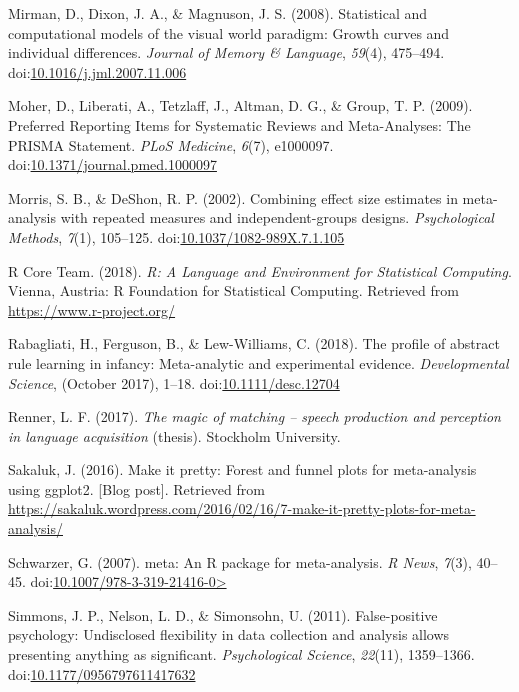\documentclass[man]{apa6}
\theoremstyle{definition}
\theoremstyle{definition}
\theoremstyle{definition}
\theoremstyle{remark}
\begin{document}
\hypertarget{ref-Mirman2008}{}
Mirman, D., Dixon, J. A., \& Magnuson, J. S. (2008). Statistical and
computational models of the visual world paradigm: Growth curves and
individual differences. \emph{Journal of Memory \& Language},
\emph{59}(4), 475--494.
doi:\href{https://doi.org/10.1016/j.jml.2007.11.006}{10.1016/j.jml.2007.11.006}

\hypertarget{ref-Moher2009}{}
Moher, D., Liberati, A., Tetzlaff, J., Altman, D. G., \& Group, T. P.
(2009). Preferred Reporting Items for Systematic Reviews and
Meta-Analyses: The PRISMA Statement. \emph{PLoS Medicine}, \emph{6}(7),
e1000097.
doi:\href{https://doi.org/10.1371/journal.pmed.1000097}{10.1371/journal.pmed.1000097}

\hypertarget{ref-morris2002combining}{}
Morris, S. B., \& DeShon, R. P. (2002). Combining effect size estimates
in meta-analysis with repeated measures and independent-groups designs.
\emph{Psychological Methods}, \emph{7}(1), 105--125.
doi:\href{https://doi.org/10.1037/1082-989X.7.1.105}{10.1037/1082-989X.7.1.105}

\hypertarget{ref-R}{}
R Core Team. (2018). \emph{R: A Language and Environment for Statistical
Computing}. Vienna, Austria: R Foundation for Statistical Computing.
Retrieved from \url{https://www.r-project.org/}

\hypertarget{ref-Rabagliati2018}{}
Rabagliati, H., Ferguson, B., \& Lew-Williams, C. (2018). The profile of
abstract rule learning in infancy: Meta-analytic and experimental
evidence. \emph{Developmental Science}, (October 2017), 1--18.
doi:\href{https://doi.org/10.1111/desc.12704}{10.1111/desc.12704}

\hypertarget{ref-Renner2017}{}
Renner, L. F. (2017). \emph{The magic of matching -- speech production
and perception in language acquisition} (thesis). Stockholm University.

\hypertarget{ref-Sakaluk2016}{}
Sakaluk, J. (2016). Make it pretty: Forest and funnel plots for
meta-analysis using ggplot2. {[}Blog post{]}. Retrieved from
\url{https://sakaluk.wordpress.com/2016/02/16/7-make-it-pretty-plots-for-meta-analysis/}

\hypertarget{ref-meta}{}
Schwarzer, G. (2007). meta: An R package for meta-analysis. \emph{R
News}, \emph{7}(3), 40--45.
doi:\href{https://doi.org/10.1007/978-3-319-21416-0\%3E}{10.1007/978-3-319-21416-0\textgreater{}}

\hypertarget{ref-Simmons2011}{}
Simmons, J. P., Nelson, L. D., \& Simonsohn, U. (2011). False-positive
psychology: Undisclosed flexibility in data collection and analysis
allows presenting anything as significant. \emph{Psychological Science},
\emph{22}(11), 1359--1366.
doi:\href{https://doi.org/10.1177/0956797611417632}{10.1177/0956797611417632}
\end{document}
